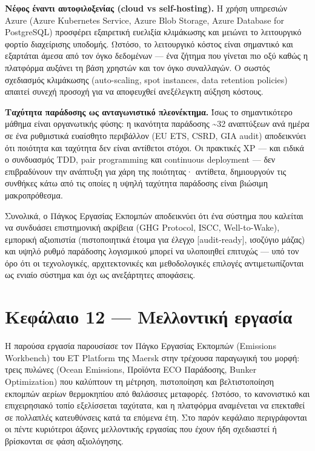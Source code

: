 \documentclass[11pt,a4paper,greek,twoside]{template-xe}
\begin{document}
\textbf{Νέφος έναντι αυτοφιλοξενίας (cloud vs self-hosting).} Η χρήση
υπηρεσιών Azure (Azure Kubernetes Service, Azure Blob Storage, Azure
Database for PostgreSQL) προσφέρει εξαιρετική ευελιξία κλιμάκωσης και
μειώνει το λειτουργικό φορτίο διαχείρισης υποδομής. Ωστόσο, το
λειτουργικό κόστος είναι σημαντικό και εξαρτάται άμεσα από τον όγκο
δεδομένων --- ένα ζήτημα που γίνεται πιο οξύ καθώς η πλατφόρμα αυξάνει
τη βάση χρηστών και τον όγκο συναλλαγών. Ο σωστός σχεδιασμός κλιμάκωσης
(auto-scaling, spot instances, data retention policies) απαιτεί συνεχή
προσοχή για να αποφευχθεί ανεξέλεγκτη αύξηση κόστους.

\textbf{Ταχύτητα παράδοσης ως ανταγωνιστικό πλεονέκτημα.} Ίσως το
σημαντικότερο μάθημα είναι οργανωτικής φύσης: η ικανότητα παράδοσης
\textasciitilde32 αναπτύξεων ανά ημέρα σε ένα ρυθμιστικά ευαίσθητο
περιβάλλον (EU ETS, CSRD, GIA audit) αποδεικνύει ότι ποιότητα και
ταχύτητα δεν είναι αντίθετοι στόχοι. Οι πρακτικές XP --- και ειδικά ο
συνδυασμός TDD, pair programming και continuous deployment --- δεν
επιβραδύνουν την ανάπτυξη για χάρη της ποιότητας· αντίθετα, δημιουργούν
τις συνθήκες κάτω από τις οποίες η υψηλή ταχύτητα παράδοσης είναι
βιώσιμη μακροπρόθεσμα.

Συνολικά, ο Πάγκος Εργασίας Εκπομπών αποδεικνύει ότι ένα σύστημα που
καλείται να συνδυάσει επιστημονική ακρίβεια (GHG Protocol, ISCC,
Well-to-Wake), εμπορική αξιοπιστία (πιστοποιητικά έτοιμα για έλεγχο
{[}audit-ready{]}, ισοζύγιο μάζας) και υψηλό ρυθμό παράδοσης λογισμικού
μπορεί να υλοποιηθεί επιτυχώς --- υπό τον όρο ότι οι τεχνολογικές,
αρχιτεκτονικές και μεθοδολογικές επιλογές αντιμετωπίζονται ως ενιαίο
σύστημα και όχι ως ανεξάρτητες αποφάσεις.

\pagebreak

\chapter{Κεφάλαιο 12 --- Μελλοντική
εργασία}\label{ux3baux3b5ux3c6ux3acux3bbux3b1ux3b9ux3bf-12-ux3bcux3b5ux3bbux3bbux3bfux3bdux3c4ux3b9ux3baux3ae-ux3b5ux3c1ux3b3ux3b1ux3c3ux3afux3b1}

Η παρούσα εργασία παρουσίασε τον Πάγκο Εργασίας Εκπομπών (Emissions
Workbench) του ET Platform της Maersk στην τρέχουσα παραγωγική του
μορφή: τρεις πυλώνες (Ocean Emissions, Προϊόντα ECO Παράδοσης, Bunker
Optimization) που καλύπτουν τη μέτρηση, πιστοποίηση και βελτιστοποίηση
εκπομπών αερίων θερμοκηπίου από θαλάσσιες μεταφορές. Ωστόσο, το
κανονιστικό και επιχειρησιακό τοπίο εξελίσσεται ταχύτατα, και η
πλατφόρμα αναμένεται να επεκταθεί σε πολλαπλές κατευθύνσεις κατά τα
επόμενα έτη. Στο παρόν κεφάλαιο περιγράφονται οι πέντε κυριότεροι άξονες
μελλοντικής εργασίας που έχουν ήδη σχεδιαστεί ή βρίσκονται σε φάση
αξιολόγησης.
\end{document}
